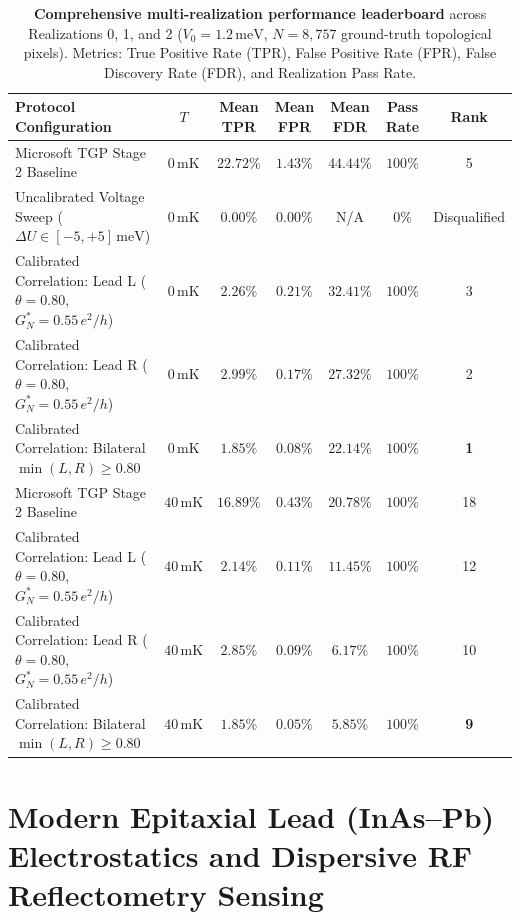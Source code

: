 \documentclass[aps,prb,reprint,superscriptaddress,showpacs,amsmath,amssymb]{revtex4-2}
\begin{document}
\begin{table}[t]
\small
\caption{\textbf{Comprehensive multi-realization performance leaderboard} across Realizations 0, 1, and 2 ($V_0 = 1.2\,\mathrm{meV}$, $N = 8,757$ ground-truth topological pixels). Metrics: True Positive Rate (TPR), False Positive Rate (FPR), False Discovery Rate (FDR), and Realization Pass Rate.}
\label{tab:extended_leaderboard}
\begin{ruledtabular}
\begin{tabular*}{\textwidth}{@{\extracolsep{\fill}}lcccccc}
Protocol Configuration & $T$ & Mean TPR & Mean FPR & Mean FDR & Pass Rate & Rank \\
\hline
Microsoft TGP Stage 2 Baseline & $0\,\mathrm{mK}$ & $22.72\%$ & $1.43\%$ & $44.44\%$ & $100\%$ & 5 \\
Uncalibrated Voltage Sweep ($\Delta U \in [-5, +5]\,\mathrm{meV}$) & $0\,\mathrm{mK}$ & $0.00\%$ & $0.00\%$ & N/A & $0\%$ & Disqualified \\
Calibrated Correlation: Lead L ($\theta = 0.80$, $G_N^* = 0.55\,e^2/h$) & $0\,\mathrm{mK}$ & $2.26\%$ & $0.21\%$ & $32.41\%$ & $100\%$ & 3 \\
Calibrated Correlation: Lead R ($\theta = 0.80$, $G_N^* = 0.55\,e^2/h$) & $0\,\mathrm{mK}$ & $2.99\%$ & $0.17\%$ & $27.32\%$ & $100\%$ & 2 \\
Calibrated Correlation: Bilateral $\min(L, R) \ge 0.80$ & $0\,\mathrm{mK}$ & $1.85\%$ & $\mathbf{0.08\%}$ & $\mathbf{22.14\%}$ & $100\%$ & \textbf{1} \\
\hline
Microsoft TGP Stage 2 Baseline & $40\,\mathrm{mK}$ & $16.89\%$ & $0.43\%$ & $20.78\%$ & $100\%$ & 18 \\
Calibrated Correlation: Lead L ($\theta = 0.80$, $G_N^* = 0.55\,e^2/h$) & $40\,\mathrm{mK}$ & $2.14\%$ & $0.11\%$ & $11.45\%$ & $100\%$ & 12 \\
Calibrated Correlation: Lead R ($\theta = 0.80$, $G_N^* = 0.55\,e^2/h$) & $40\,\mathrm{mK}$ & $2.85\%$ & $0.09\%$ & $6.17\%$ & $100\%$ & 10 \\
Calibrated Correlation: Bilateral $\min(L, R) \ge 0.80$ & $40\,\mathrm{mK}$ & $1.85\%$ & $\mathbf{0.05\%}$ & $\mathbf{5.85\%}$ & $100\%$ & \textbf{9} \\
\end{tabular*}
\end{ruledtabular}
\end{table}

\section{Modern Epitaxial Lead (InAs--Pb) Electrostatics and Dispersive RF Reflectometry Sensing}
\label{sec:lead_electrostatics}
\end{document}
